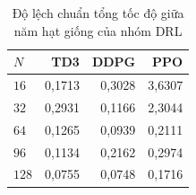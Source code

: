 \begin{table}[htbp]
\centering
\caption{Độ lệch chuẩn tổng tốc độ giữa năm hạt giống của nhóm DRL}
\label{tab:ch4-do-lech}
\footnotesize
\begin{tabular}{@{}lrrr@{}}
\toprule
$N$ & \textbf{TD3} & \textbf{DDPG} & \textbf{PPO} \\
\midrule
$16$ & 0,1713 & 0,3028 & 3,6307 \\
$32$ & 0,2931 & 0,1166 & 2,3044 \\
$64$ & 0,1265 & 0,0939 & 0,2111 \\
$96$ & 0,1134 & 0,2162 & 0,2974 \\
$128$ & 0,0755 & 0,0748 & 0,1716 \\
\bottomrule
\end{tabular}
\end{table}
